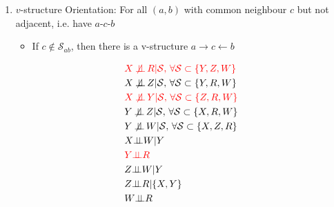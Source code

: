 \begin{enumerate}[topsep=2pt,itemsep=2pt]
\begin{center}
        \end{center}
    
    
    \item $ v $-structure Orientation: For all $ (a,b) $ with common neighbour $ c $ but not adjacent, i.e. have $ a $-$ c $-$ b $
    \begin{itemize}[topsep=2pt,itemsep=2pt]
        \item If $ c\notin \mathcal{S}_{ab} $, then there is a v-structure $ a\to c\leftarrow b $
    \end{itemize}
    \begin{center}
        \begin{minipage}{0.4\linewidth}
            \begin{align}
                &\color{red}X \not\!\!\mathop{\independent} R |\mathcal{S},\,\forall \mathcal{S}\subset\{Y,Z,W\}\\
                &X \not\!\!\mathop{\independent} Z |\mathcal{S},\,\forall \mathcal{S}\subset\{Y,R,W\}\\
                &\color{red}X \not\!\!\mathop{\independent} Y |\mathcal{S},\,\forall \mathcal{S}\subset\{Z,R,W\}\\
                &Y \not\!\!\mathop{\independent} Z |\mathcal{S},\,\forall \mathcal{S}\subset\{X,R,W\}\\
                &Y \not\!\!\mathop{\independent} W |\mathcal{S},\,\forall \mathcal{S}\subset\{X,Z,R\}\\
                &X\independent W|Y\\
                &\color{red}Y\independent R\\
                &Z\independent W|Y\\
                &Z\independent R|\{X,Y\}\\
                &W\independent R
            \end{align}
        \end{minipage}
\end{center}
\end{enumerate}
